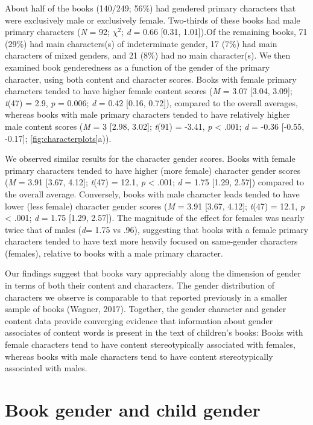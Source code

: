 \documentclass[english,,man,floatsintext]{apa6}
\begin{document}
About half of the books (140/249; 56\%) had gendered primary characters that were exclusively male or exclusively female. Two-thirds of these books had male primary characters (\emph{N} = 92; \(\chi^2\); \emph{d} = 0.66 {[}0.31, 1.01{]}).Of the remaining books, 71 (29\%) had main characters(s) of indeterminate gender, 17 (7\%) had main characters of mixed genders, and 21 (8\%) had no main character(s). We then examined book genderedness as a function of the gender of the primary character, using both content and character scores. Books with female primary characters tended to have higher female content scores (\emph{M} = 3.07 {[}3.04, 3.09{]}; \emph{t}(47) = 2.9, \emph{p} = 0.006; \emph{d} = 0.42 {[}0.16, 0.72{]}), compared to the overall averages, whereas books with male primary characters tended to have relatively higher male content scores (\emph{M} = 3 {[}2.98, 3.02{]}; \emph{t}(91) = -3.41, \emph{p} \textless{} .001; \emph{d} = -0.36 {[}-0.55, -0.17{]}; \autoref{fig:characterplots}a)).

We observed similar results for the character gender scores. Books with female primary characters tended to have higher (more female) character gender scores (\emph{M} = 3.91 {[}3.67, 4.12{]}; \emph{t}(47) = 12.1, \emph{p} \textless{} .001; \emph{d} = 1.75 {[}1.29, 2.57{]}) compared to the overall average. Conversely, books with male character leads tended to have lower (less female) character gender scores (\emph{M} = 3.91 {[}3.67, 4.12{]}; \emph{t}(47) = 12.1, \emph{p} \textless{} .001; \emph{d} = 1.75 {[}1.29, 2.57{]}). The magnitude of the effect for females was nearly twice that of males (\emph{d}= 1.75 vs .96), suggesting that books with a female primary characters tended to have text more heavily focused on same-gender characters (females), relative to books with a male primary character.

Our findings suggest that books vary appreciably along the dimension of gender in terms of both their content and characters. The gender distribution of characters we observe is comparable to that reported previously in a smaller sample of books (Wagner, 2017). Together, the gender character and gender content data provide converging evidence that information about gender associates of content words is present in the text of children's books: Books with female characters tend to have content stereotypically associated with females, whereas books with male characters tend to have content stereotypically associated with males.

\hypertarget{book-gender-and-child-gender}{%
\section{Book gender and child gender}\label{book-gender-and-child-gender}}
\end{document}
